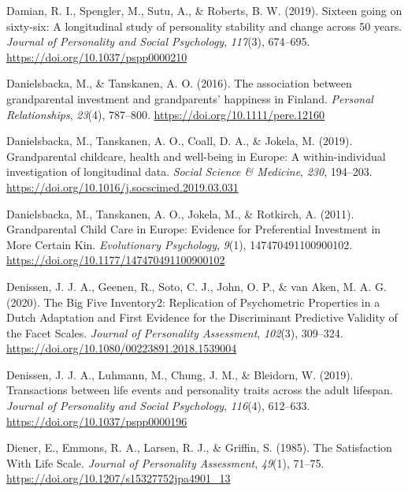 \documentclass[
  english,
  man, noextraspace]{apa7}
\begin{document}
\leavevmode\hypertarget{ref-damianSixteenGoingSixtysix2019}{}%
Damian, R. I., Spengler, M., Sutu, A., \& Roberts, B. W. (2019). Sixteen going on sixty-six: A longitudinal study of personality stability and change across 50 years. \emph{Journal of Personality and Social Psychology}, \emph{117}(3), 674--695. \url{https://doi.org/10.1037/pspp0000210}

\leavevmode\hypertarget{ref-danielsbackaAssociationGrandparentalInvestment2016}{}%
Danielsbacka, M., \& Tanskanen, A. O. (2016). The association between grandparental investment and grandparents' happiness in Finland. \emph{Personal Relationships}, \emph{23}(4), 787--800. \url{https://doi.org/10.1111/pere.12160}

\leavevmode\hypertarget{ref-danielsbackaGrandparentalChildcareHealth2019}{}%
Danielsbacka, M., Tanskanen, A. O., Coall, D. A., \& Jokela, M. (2019). Grandparental childcare, health and well-being in Europe: A within-individual investigation of longitudinal data. \emph{Social Science \& Medicine}, \emph{230}, 194--203. \url{https://doi.org/10.1016/j.socscimed.2019.03.031}

\leavevmode\hypertarget{ref-danielsbackaGrandparentalChildCare2011}{}%
Danielsbacka, M., Tanskanen, A. O., Jokela, M., \& Rotkirch, A. (2011). Grandparental Child Care in Europe: Evidence for Preferential Investment in More Certain Kin. \emph{Evolutionary Psychology}, \emph{9}(1), 147470491100900102. \url{https://doi.org/10.1177/147470491100900102}

\leavevmode\hypertarget{ref-denissenBigFiveInventory2020}{}%
Denissen, J. J. A., Geenen, R., Soto, C. J., John, O. P., \& van Aken, M. A. G. (2020). The Big Five Inventory2: Replication of Psychometric Properties in a Dutch Adaptation and First Evidence for the Discriminant Predictive Validity of the Facet Scales. \emph{Journal of Personality Assessment}, \emph{102}(3), 309--324. \url{https://doi.org/10.1080/00223891.2018.1539004}

\leavevmode\hypertarget{ref-denissenTransactionsLifeEvents2019}{}%
Denissen, J. J. A., Luhmann, M., Chung, J. M., \& Bleidorn, W. (2019). Transactions between life events and personality traits across the adult lifespan. \emph{Journal of Personality and Social Psychology}, \emph{116}(4), 612--633. \url{https://doi.org/10.1037/pspp0000196}

\leavevmode\hypertarget{ref-dienerSatisfactionLifeScale1985}{}%
Diener, E., Emmons, R. A., Larsen, R. J., \& Griffin, S. (1985). The Satisfaction With Life Scale. \emph{Journal of Personality Assessment}, \emph{49}(1), 71--75. \url{https://doi.org/10.1207/s15327752jpa4901_13}
\end{document}

